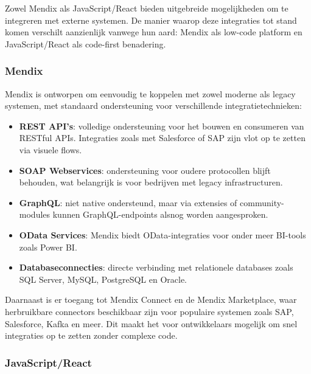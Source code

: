 Zowel Mendix als JavaScript/React bieden uitgebreide mogelijkheden om te integreren met externe systemen. De manier waarop deze integraties tot stand komen verschilt aanzienlijk vanwege hun aard: Mendix als low-code platform en JavaScript/React als code-first benadering.

\subsubsection{Mendix}

Mendix is ontworpen om eenvoudig te koppelen met zowel moderne als legacy systemen, met standaard ondersteuning voor verschillende integratietechnieken:
\begin{itemize}
    \item \textbf{REST \gls{API}'s}: volledige ondersteuning voor het bouwen en consumeren van RESTful APIs. Integraties zoals met Salesforce of SAP zijn vlot op te zetten via visuele flows.
    \item \textbf{SOAP Webservices}: ondersteuning voor oudere protocollen blijft behouden, wat belangrijk is voor bedrijven met legacy infrastructuren.
    \item \textbf{GraphQL}: niet native ondersteund, maar via extensies of community-modules kunnen GraphQL-endpoints alsnog worden aangesproken.
    \item \textbf{OData Services}: Mendix biedt OData-integraties voor onder meer BI-tools zoals Power BI.
    \item \textbf{Databaseconnecties}: directe verbinding met relationele databases zoals SQL Server, MySQL, PostgreSQL en Oracle.
\end{itemize}

Daarnaast is er toegang tot Mendix Connect en de Mendix Marketplace, waar herbruikbare connectors beschikbaar zijn voor populaire systemen zoals SAP, Salesforce, Kafka en meer. Dit maakt het voor ontwikkelaars mogelijk om snel integraties op te zetten zonder complexe code.

\subsubsection{JavaScript/React}

